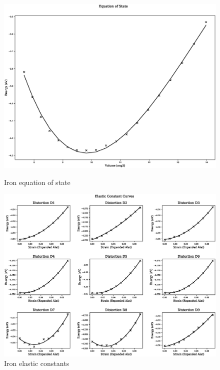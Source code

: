 \begin{figure}[ht] 
  \begin{minipage}[b]{0.4\linewidth}
    \centering
    \includegraphics[width=.9\linewidth]{chapters/results_potential_fitting/pot_fepd_fcc_2/fe_eos_1.eps} 
    \caption{Iron equation of state}  
  \end{minipage}%
  \begin{minipage}[b]{0.4\linewidth}
    \centering
    \includegraphics[width=.9\linewidth]{chapters/results_potential_fitting/pot_fepd_fcc_2/fe_ec_1.eps} 
    \caption{Iron elastic constants}  
  \end{minipage}%
\end{figure}


